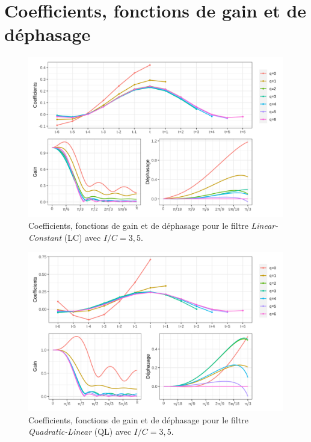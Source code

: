 \documentclass[
  12pt,
  a4paper,french]{article}
\newcommand\1{\mathds{1}}
\begin{document}
\newpage

\hypertarget{an-graphs}{%
\section{Coefficients, fonctions de gain et de déphasage}\label{an-graphs}}

\begin{figure}[H]

{\centering \includegraphics[width=1\linewidth]{img/filters_used/lc} 

}

\caption[Coefficients, fonctions de gain et de déphasage pour le filtre \emph{Linear-Constant} (LC) avec \(I/C=3,5\)]{Coefficients, fonctions de gain et de déphasage pour le filtre \emph{Linear-Constant} (LC) avec \(I/C=3,5\).}\label{fig:graphslc}

\footnotesize
\normalsize\end{figure}

\begin{figure}[H]

{\centering \includegraphics[width=1\linewidth]{img/filters_used/ql} 

}

\caption[Coefficients, fonctions de gain et de déphasage pour le filtre \emph{Quadratic-Linear} (QL) avec \(I/C=3,5\)]{Coefficients, fonctions de gain et de déphasage pour le filtre \emph{Quadratic-Linear} (QL) avec \(I/C=3,5\).}\label{fig:graphsql}

\footnotesize
\normalsize\end{figure}
\end{document}
